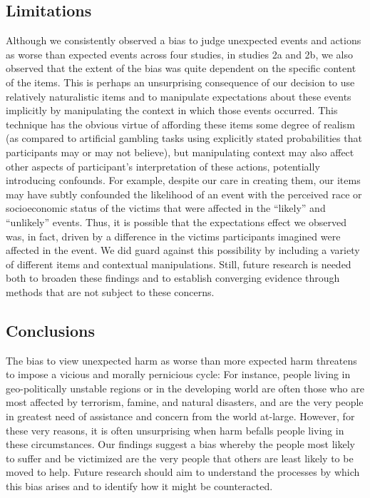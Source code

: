 \documentclass[10pt, letterpaper]{article}
\begin{document}
\subsection{Limitations}\label{limitations}

Although we consistently observed a bias to judge unexpected events and
actions as worse than expected events across four studies, in studies 2a
and 2b, we also observed that the extent of the bias was quite dependent
on the specific content of the items. This is perhaps an unsurprising
consequence of our decision to use relatively naturalistic items and to
manipulate expectations about these events implicitly by manipulating
the context in which those events occurred. This technique has the
obvious virtue of affording these items some degree of realism (as
compared to artificial gambling tasks using explicitly stated
probabilities that participants may or may not believe), but
manipulating context may also affect other aspects of participant's
interpretation of these actions, potentially introducing confounds. For
example, despite our care in creating them, our items may have subtly
confounded the likelihood of an event with the perceived race or
socioeconomic status of the victims that were affected in the ``likely''
and ``unlikely'' events. Thus, it is possible that the expectations
effect we observed was, in fact, driven by a difference in the victims
participants imagined were affected in the event. We did guard against
this possibility by including a variety of different items and
contextual manipulations. Still, future research is needed both to
broaden these findings and to establish converging evidence through
methods that are not subject to these concerns.

\subsection{Conclusions}\label{conclusions}

The bias to view unexpected harm as worse than more expected harm
threatens to impose a vicious and morally pernicious cycle: For
instance, people living in geo-politically unstable regions or in the
developing world are often those who are most affected by terrorism,
famine, and natural disasters, and are the very people in greatest need
of assistance and concern from the world at-large. However, for these
very reasons, it is often unsurprising when harm befalls people living
in these circumstances. Our findings suggest a bias whereby the people
most likely to suffer and be victimized are the very people that others
are least likely to be moved to help. Future research should aim to
understand the processes by which this bias arises and to identify how
it might be counteracted.
\end{document}
